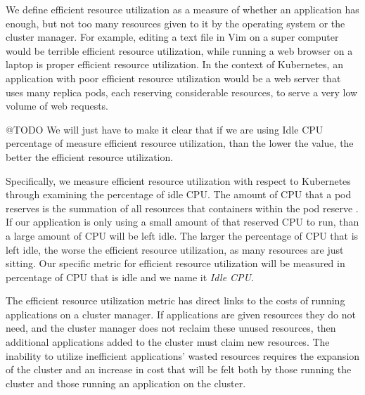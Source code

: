 We define efficient resource utilization as a measure of whether an application
has enough, but not too many resources given to it by the operating system or
the cluster manager. For example, editing a text file in Vim on a super computer
would be terrible efficient resource utilization, while running a web browser on
a laptop is proper efficient resource utilization. In the context of Kubernetes,
an application with poor efficient resource utilization would be a web server
that uses many replica pods, each reserving considerable resources,
to serve a very low volume of web requests.

@TODO We will just have to make it clear that if we are using Idle CPU
percentage of measure efficient resource utilization, than the lower the value,
the better the efficient resource utilization.

Specifically, we measure efficient resource utilization with respect to
Kubernetes through examining the percentage of idle CPU.
The amount of CPU that a pod reserves is the summation of
all resources that containers within the pod reserve
\cite{k8s-compute-resources}. If our application is only using a small amount of
that reserved CPU to run, than a large amount of CPU will be left idle. The
larger the percentage of CPU that is left idle, the worse the efficient resource
utilization, as many resources are just sitting. Our specific metric for efficient resource
utilization will be measured in percentage of CPU that is idle and we name it
\textit{Idle CPU}.

The efficient resource utilization metric has direct links to the costs of
running applications on a cluster manager. If applications are given resources
they do not need, and the cluster manager does not reclaim these unused
resources, then additional applications added to the cluster must claim new
resources. The inability to utilize inefficient applications' wasted resources
requires the expansion of the cluster and an increase in cost that will be felt
both by those running the cluster and those running an application on the
cluster.
